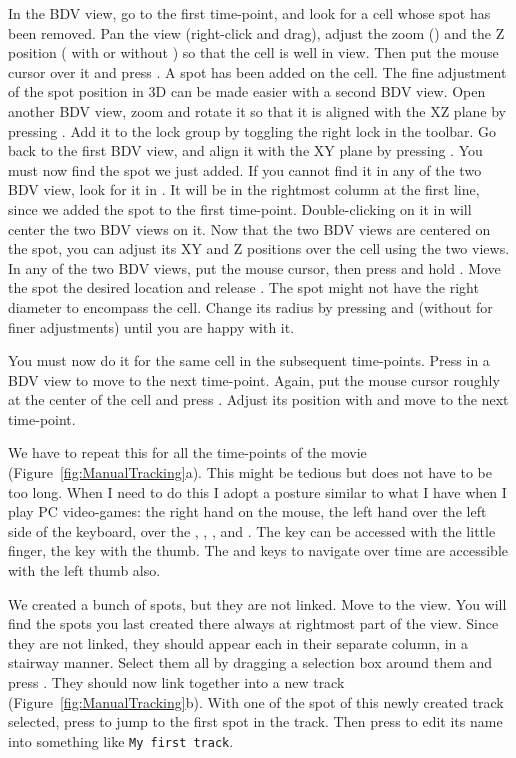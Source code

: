 In the BDV view, go to the first time-point, and look for a cell whose spot has been removed.
Pan the view (right-click and drag), adjust the zoom () and the Z position ( with or without \keys{\shift}) so that the cell is well in view.
Then put the mouse cursor over it and press .
A spot has been added on the cell.
The fine adjustment of the spot position in 3D can be made easier with a second BDV view.
Open another BDV view, zoom and rotate it so that it is aligned with the XZ plane by pressing .
Add it to the lock group by toggling the right lock  in the toolbar.
Go back to the first BDV view, and align it with the XY plane by pressing .
You must now find the spot we just added. 
If you cannot find it in any of the two BDV view, look for it in \TrackScheme.
It will be in the rightmost column at the first line, since we added the spot to the first time-point.
Double-clicking on it in \TrackScheme will center the two BDV views on it.
Now that the two BDV views are centered on the spot, you can adjust its XY and Z positions over the cell using the two views.
In any of the two BDV views, put the mouse cursor, then press and hold .
Move the spot the desired location and release .
The spot might not have the right diameter to encompass the cell.
Change its radius by pressing  and  (without \keys{\shift} for finer adjustments) until you are happy with it.

You must now do it for the same cell in the subsequent time-points.
Press  in a BDV view to move to the next time-point.
Again, put the mouse cursor roughly at the center of the cell and press .
Adjust its position with  and move to the next time-point.

We have to repeat this for all the time-points of the movie (Figure~\ref{fig:ManualTracking}a).
This might be tedious but does not have to be too long. 
When I need to do this I adopt a posture similar to what I have when I play PC video-games: the right hand on the mouse, the left hand over the left side of the keyboard, over the , , , and .
The \keys{\shift} key can be accessed with the little finger, the  key with the thumb.
The  and  keys to navigate over time are accessible with the left thumb also.

We created a bunch of spots, but they are not linked. 
Move to the \TrackScheme view. 
You will find the spots you last created there always at rightmost part of the view.
Since they are not linked, they should appear each in their separate column, in a stairway manner. 
Select them all by dragging a selection box around them and press .
They should now link together into a new track (Figure~\ref{fig:ManualTracking}b).
With one of the spot of this newly created track selected, press \keys{\Alt+\arrowkeyup} to jump to the first spot in the track.
Then press \keys{\return} to edit its name into something like \texttt{My first track}.

